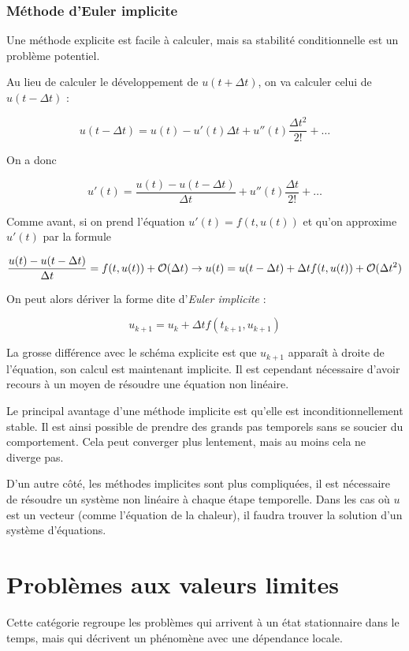 		 \subsubsection{Méthode d'Euler implicite}
		 
		 Une méthode explicite est facile à calculer, mais sa stabilité conditionnelle est un problème potentiel.
		 
		 Au lieu de calculer le développement de $u(t + \Delta t)$, on va calculer celui de $u(t - \Delta t)$ :
		 
		 $$u(t - \Delta t) = u(t) - u'(t) \Delta t + u''(t) \frac{\Delta t^2}{2!} + \dots$$
		 
		 On a donc
		 
		 $$u'(t) = \frac{u(t) - u(t - \Delta t)}{\Delta t} + u''(t) \frac{\Delta t}{2!} + \dots$$
		 
		 
		Comme avant, si on prend l'équation $u'(t) = f(t, u(t))$ et qu'on approxime $u'(t)$ par la formule 
		
		$$\frac{u(t) - u(t - \Delta t)}{\Delta t} = f(t, u(t)) + \mathcal{O} (\Delta t) \rightarrow u(t) = u(t - \Delta t) + \Delta t f(t, u(t)) + \mathcal{O} (\Delta t^2)$$
		 
		 
		 On peut alors dériver la forme dite d'\textit{Euler implicite} :
		 
		 $$u_{k + 1} = u_k + \Delta t f(t_{k + 1}, u_{k + 1})$$
		 
		 La grosse différence avec le schéma explicite est que $u_{k + 1}$ apparaît à droite de l'équation, son calcul est maintenant implicite. Il est cependant nécessaire d'avoir recours à un moyen de résoudre une équation non linéaire.
		 
		 Le principal avantage d'une méthode implicite est qu'elle est inconditionnellement stable. Il est ainsi possible de prendre des grands pas temporels sans se soucier du comportement. Cela peut converger plus lentement, mais au moins cela ne diverge pas.
		 
		 D'un autre côté, les méthodes implicites sont plus compliquées, il est nécessaire de résoudre un système non linéaire à chaque étape temporelle. Dans les cas où $u$ est un vecteur (comme l'équation de la chaleur), il faudra trouver la solution d'un système d'équations.
		 

\section{Problèmes aux valeurs limites}

Cette catégorie regroupe les problèmes qui arrivent à un état stationnaire dans le temps, mais qui décrivent un phénomène avec une dépendance locale.

